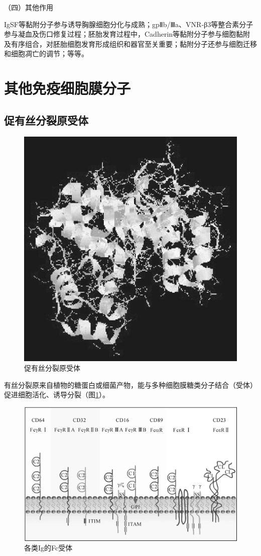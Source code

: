 （四）其他作用

IgSF等黏附分子参与诱导胸腺细胞分化与成熟；gpⅡb/Ⅲa、VNR-β3等整合素分子参与凝血及伤口修复过程；胚胎发育过程中，Cadherin等黏附分子参与细胞黏附及有序组合，对胚胎细胞发育形成组织和器官至关重要；黏附分子还参与细胞迁移和细胞凋亡的调节；等等。

\section{其他免疫细胞膜分子}


\subsection{促有丝分裂原受体}

\begin{figure}[!htbp]
 \centering
 \includegraphics[width=.6\textwidth]{./images/Image00122.jpg}
 \captionsetup{justification=centering}
 \caption{促有丝分裂原受体}
 \label{fig8-12}
  \end{figure} 

有丝分裂原来自植物的糖蛋白或细菌产物，能与多种细胞膜糖类分子结合（受体）促进细胞活化、诱导分裂（图\ref{fig8-12}）。

\begin{figure}[!htbp]
 \centering
 \includegraphics[width=.6\textwidth]{./images/Image00123.jpg}
 \captionsetup{justification=centering}
 \caption{各类Ig的Fc受体}
 \label{fig8-13}
  \end{figure} 


